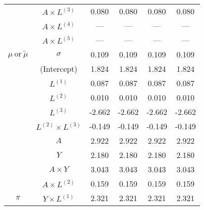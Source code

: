 \begin{table}
\begin{minipage}[t]{0.5\textwidth}
\begin{tabular}[t]{|>{}c|c|c|c|c|>{}c|}
 & $A \times L^{(3)}$ & 0.080 & 0.080 & 0.080 & 0.080\\
\cline{2-6}
 & $A \times L^{(4)}$ & --- & --- & --- & ---\\
\cline{2-6}
 & $A \times L^{(5)}$ & --- & --- & --- & ---\\
\cline{2-6}
\multirow{-15}{*}{\centering\arraybackslash $\mu~\text{or}~\tilde\mu$} & $\sigma$ & 0.109 & 0.109 & 0.109 & 0.109\\
\cline{1-6}
 & (Intercept) & 1.824 & 1.824 & 1.824 & 1.824\\
\cline{2-6}
 & $L^{(1)}$ & 0.087 & 0.087 & 0.087 & 0.087\\
\cline{2-6}
 & $L^{(2)}$ & 0.010 & 0.010 & 0.010 & 0.010\\
\cline{2-6}
 & $L^{(3)}$ & -2.662 & -2.662 & -2.662 & -2.662\\
\cline{2-6}
 & $L^{(2)} \times L^{(3)}$ & -0.149 & -0.149 & -0.149 & -0.149\\
\cline{2-6}
 & $A$ & 2.922 & 2.922 & 2.922 & 2.922\\
\cline{2-6}
 & $Y$ & 2.180 & 2.180 & 2.180 & 2.180\\
\cline{2-6}
 & $A\times Y$ & 3.043 & 3.043 & 3.043 & 3.043\\
\cline{2-6}
 & $A \times L^{(2)}$ & 0.159 & 0.159 & 0.159 & 0.159\\
\cline{2-6}
\multirow{-10}{*}{\centering\arraybackslash $\pi$} & $Y \times L^{(1)}$ & 2.321 & 2.321 & 2.321 & 2.321\\
\hline
\end{tabular}
\end{minipage}
\begin{minipage}[t]{0.5\textwidth}


\end{minipage}
\end{table}
